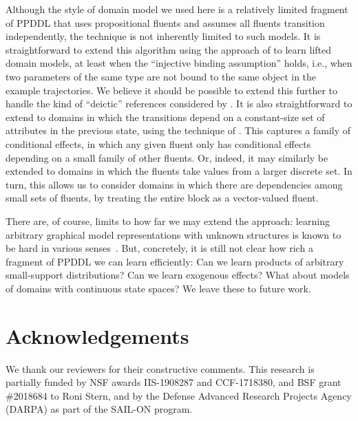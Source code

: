 \documentclass[letterpaper]{article} %
\begin{document}
Although the style of domain model we used here is a relatively limited fragment of PPDDL that uses propositional fluents and assumes all fluents transition independently, the technique is not inherently limited to such models. It is straightforward to extend this algorithm using the approach of \citet{juba2021kr} to learn lifted domain models, at least when the ``injective binding assumption'' holds, i.e., when two parameters of the same type are not bound to the same object in the example trajectories. We believe it should be possible to extend this further to handle the kind of ``deictic'' references considered by \citet{pasula2007learning}. It is also straightforward to extend to domains in which the transitions depend on a constant-size set of attributes in the previous state, using the technique of \citet{strehl2007efficient}. This captures a family of conditional effects, in which any given fluent only has conditional effects depending on a small family of other fluents. Or, indeed, it may similarly be extended to domains in which the fluents take values from a larger discrete set. In turn, this allows us to consider domains in which there are dependencies among small sets of fluents, by treating the entire block as a vector-valued fluent. 

There are, of course, limits to how far we may extend the approach: learning arbitrary graphical model representations with unknown structures is known to be hard in various senses~\cite{chickering1996learning,chickering2004large}. But, concretely, it is still not clear how rich a fragment of PPDDL we can learn efficiently: Can we learn products of arbitrary small-support distributions? Can we learn exogenous effects?  What about models of domains with continuous state spaces? We leave these to future work.

\section*{Acknowledgements}
We thank our reviewers for their constructive comments.
This research is partially funded by NSF awards IIS-1908287 and CCF-1718380,
and BSF grant \#2018684 to Roni Stern, 
and by the Defense Advanced
Research Projects Agency (DARPA) as part of the SAIL-ON program. %

\iffalse{
\section{Not in paper}

- Hardness of learning PPDDL action models from data
- Learning a standard PPDDL model. Need to add the number of effects per action to the complexity analysis. [[Roni: I think the issue here was that in Theorem 5 the sample complexity does not include the number of effects per action. This might be missing? not sure about this]]
I don't think it's missing. We conservatively take $2|F|$ as an upper bound on the number of effects per action. This is why we have $\delta'=\delta/2|F||A|$ under the log.
}\fi
\end{document}
